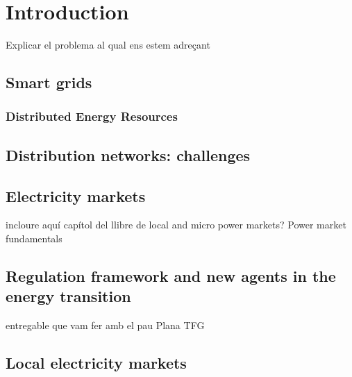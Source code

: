 \renewcommand\labelenumi{(\roman{enumi})}
\renewcommand\theenumi\labelenumi

\chapter{Introduction}
\label{chapterIntro}

Explicar el problema al qual ens estem adreçant 

\section{Smart grids}

\subsection{Distributed Energy Resources} \label{subsec:DG}

\section{Distribution networks: challenges}

\section{Electricity markets}
incloure aquí capítol del llibre de local and micro power markets? 
Power market fundamentals 


\section{Regulation framework and new agents in the energy transition}
entregable que vam fer amb el pau Plana TFG

\section{Local electricity markets}

